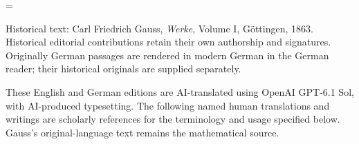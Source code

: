 \clearpage
\newcount\SavedTranslationPage
\SavedTranslationPage=\value{page}
\hypersetup{pageanchor=false}
\begingroup
\pagestyle{empty}\thispagestyle{empty}
\medskip
\small\raggedright
Historical text: Carl Friedrich Gauss, \emph{Werke}, Volume I, Göttingen, 1863. Historical editorial contributions retain their own authorship and signatures. Originally German passages are rendered in modern German in the German reader; their historical originals are supplied separately.

These English and German editions are AI-translated using OpenAI GPT-6.1 Sol, with AI-produced typesetting. The following named human translations and writings are scholarly references for the terminology and usage specified below. Gauss's original-language text remains the mathematical source.

